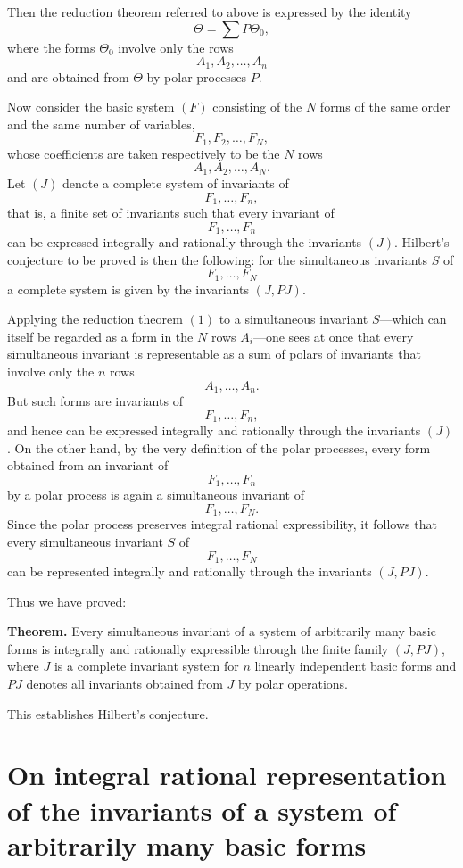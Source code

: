 \documentclass[11pt]{article}
\begin{document}
Then the reduction theorem referred to above is expressed by the identity
\[
\Theta = \sum P\Theta_0,
\tag{1}
\]
where the forms \(\Theta_0\) involve only the rows
\[
A_1,A_2,\dots,A_n
\]
and are obtained from \(\Theta\) by polar processes \(P\).

Now consider the basic system \((F)\) consisting of the \(N\) forms of the same order and the same number of variables,
\[
F_1,F_2,\dots,F_N,
\]
whose coefficients are taken respectively to be the \(N\) rows
\[
A_1,A_2,\dots,A_N.
\]
Let \((J)\) denote a complete system of invariants of
\[
F_1,\dots,F_n,
\]
that is, a finite set of invariants such that every invariant of
\[
F_1,\dots,F_n
\]
can be expressed integrally and rationally through the invariants \((J)\). Hilbert's conjecture to be proved is then the following: for the simultaneous invariants \(S\) of
\[
F_1,\dots,F_N
\]
a complete system is given by the invariants \((J,PJ)\).

Applying the reduction theorem \((1)\) to a simultaneous invariant \(S\)---which can itself be regarded as a form in the \(N\) rows \(A_i\)---one sees at once that every simultaneous invariant is representable as a sum of polars of invariants that involve only the \(n\) rows
\[
A_1,\dots,A_n.
\]
But such forms are invariants of
\[
F_1,\dots,F_n,
\]
and hence can be expressed integrally and rationally through the invariants \((J)\). On the other hand, by the very definition of the polar processes, every form obtained from an invariant of
\[
F_1,\dots,F_n
\]
by a polar process is again a simultaneous invariant of
\[
F_1,\dots,F_N.
\]
Since the polar process preserves integral rational expressibility, it follows that every simultaneous invariant \(S\) of
\[
F_1,\dots,F_N
\]
can be represented integrally and rationally through the invariants \((J,PJ)\).

Thus we have proved:

\medskip
\noindent\textbf{Theorem.}
Every simultaneous invariant of a system of arbitrarily many basic forms is integrally and rationally expressible through the finite family \((J,PJ)\), where \(J\) is a complete invariant system for \(n\) linearly independent basic forms and \(PJ\) denotes all invariants obtained from \(J\) by polar operations.

\medskip
This establishes Hilbert's conjecture.

\bigskip

\clearpage

\section*{On integral rational representation of the invariants of a system of arbitrarily many basic forms}
\end{document}

